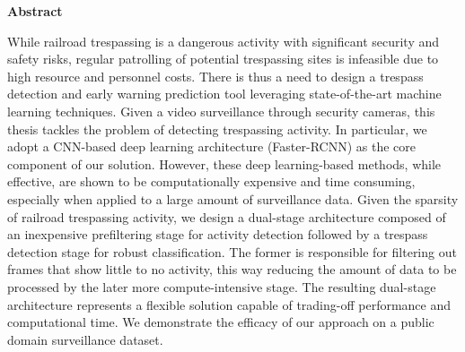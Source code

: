 
\begin{center} 
\textbf{Abstract}
\end{center}
While railroad trespassing is a dangerous activity with significant security and safety risks, regular patrolling of potential trespassing sites is infeasible due to high resource and personnel costs. There is thus a need to design a trespass detection and early warning prediction tool leveraging state-of-the-art machine learning techniques.  Given a video surveillance through security cameras, this thesis tackles the problem of detecting trespassing activity.  In particular, we adopt a CNN-based deep learning architecture (Faster-RCNN) as the core component of our solution. However, these deep learning-based methods, while effective, are shown to be computationally expensive and time consuming, especially when applied to a large amount of surveillance data. Given the sparsity of railroad trespassing activity, we design a dual-stage architecture composed of an inexpensive prefiltering stage for activity detection followed by a trespass detection stage for robust classification.  The former is responsible for filtering out frames that show little to no activity, this way reducing the amount of data to be processed by the later more compute-intensive stage.  The resulting dual-stage architecture represents a flexible solution capable of trading-off performance and computational time. We demonstrate the efficacy of our approach on a public domain surveillance dataset.
\newpage
